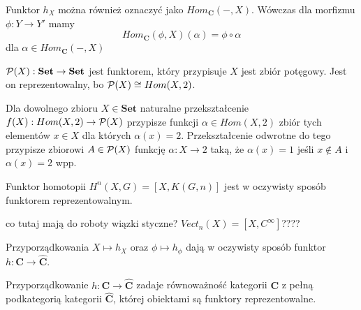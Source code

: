 Funktor $h_X$ można również oznaczyć jako $Hom_{\mathbf{C}}(-, X)$. Wówczas dla morfizmu $\phi:Y\to Y'$ mamy 
$$Hom_{\mathbf{C}}(\phi, X)(\alpha)=\phi\circ\alpha$$
dla $\alpha\in Hom_{\mathbf{C}}(-, X)$

\begin{example}
  \item $\mathcal{P}(X):\mathbf{Set}\to\mathbf{Set}$ jest funktorem, który przypisuje $X$ jest zbiór potęgowy. Jest on reprezentowalny, bo $\mathcal{P}(X)\cong Hom(X, 2)$.
    
    Dla dowolnego zbioru $X\in\mathbf{Set}$ naturalne przekształcenie $f(X):Hom(X, 2)\to \mathcal{P}(X)$ przypisze funkcji $\alpha\in Hom(X, 2)$ zbiór tych elementów $x\in X$ dla których $\alpha(x) = 2$. Przekształcenie odwrotne do tego przypisze zbiorowi $A\in\mathcal{P}(X)$ funkcję $\alpha:X\to 2$ taką, że $\alpha(x)=1$ jeśli $x\notin A$ i $\alpha(x)=2$ wpp.

  \item Funktor homotopii $H^n(X,G)=[X,K(G, n)]$ jest w oczywisty sposób funktorem reprezentowalnym.
  
  \item {\large\color{red}co tutaj mają do roboty wiązki styczne?} $Vect_n(X)=[X,C^\infty]$????
\end{example}

Przyporządkowania $X\mapsto h_X$ oraz $\phi\mapsto h_\phi$ dają w oczywisty sposób funktor $h:\mathbf{C}\to\mathbf{\hat{C}}$.

\begin{lemma}
  Przyporządkowanie $h:\mathbf{C}\to\mathbf{\hat{C}}$ zadaje równoważność kategorii $\mathbf{C}$ z pełną podkategorią kategorii $\mathbf{\hat{C}}$, której obiektami są funktory reprezentowalne.
\end{lemma}

